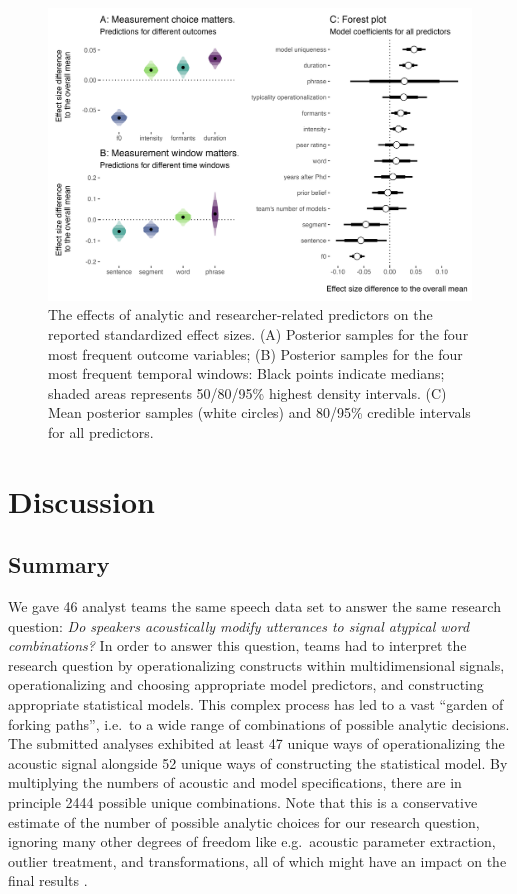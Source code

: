 \documentclass[Review,times,sageh]{sagej}
\begin{document}
\begin{figure}
\includegraphics[width=1\linewidth]{../figs/alltogether} \caption{The effects of analytic and researcher-related predictors on the reported standardized effect sizes. (A) Posterior samples for the four most frequent outcome variables; (B) Posterior samples for the four most frequent temporal windows: Black points indicate medians; shaded areas represents 50/80/95\% highest density intervals. (C) Mean posterior samples (white circles) and 80/95\% credible intervals for all predictors.}\label{fig:plot-meta2}
\end{figure}

\hypertarget{discussion}{%
\section{Discussion}\label{discussion}}

\hypertarget{summary}{%
\subsection{Summary}\label{summary}}

We gave 46 analyst teams the same speech data set to answer the same research question: \emph{Do
speakers acoustically modify utterances to signal atypical word combinations?}
In order to answer this question, teams had to interpret the research question by
operationalizing constructs within multidimensional signals, operationalizing and choosing appropriate model predictors, and constructing appropriate statistical models.
This complex process has led to a vast ``garden of forking paths'', i.e.~to a wide range of combinations of possible analytic decisions.
The submitted analyses exhibited at least 47 unique ways of operationalizing the acoustic signal alongside 52 unique ways of constructing the statistical model.
By multiplying the numbers of acoustic and model specifications, there are in principle 2444 possible unique combinations.
Note that this is a conservative estimate of the number of possible analytic choices for our research question, ignoring many other degrees of freedom like e.g.~acoustic parameter extraction, outlier treatment, and transformations, all of which might have an impact on the final results \citep{breznau2021observing}.
\end{document}

